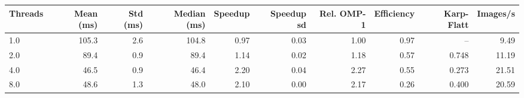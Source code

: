 \begin{tabular}{lrrrrrrrrr}
\toprule
Threads & Mean (ms) & Std (ms) & Median (ms) & Speedup & Speedup sd & Rel. OMP-1 & Efficiency & Karp-Flatt & Images/s \\
\midrule
1.0 & 105.3 & 2.6 & 104.8 & 0.97 & 0.03 & 1.00 & 0.97 & -- & 9.49 \\
2.0 & 89.4 & 0.9 & 89.4 & 1.14 & 0.02 & 1.18 & 0.57 & 0.748 & 11.19 \\
4.0 & 46.5 & 0.9 & 46.4 & 2.20 & 0.04 & 2.27 & 0.55 & 0.273 & 21.51 \\
8.0 & 48.6 & 1.3 & 48.0 & 2.10 & 0.00 & 2.17 & 0.26 & 0.400 & 20.59 \\
\bottomrule
\end{tabular}
